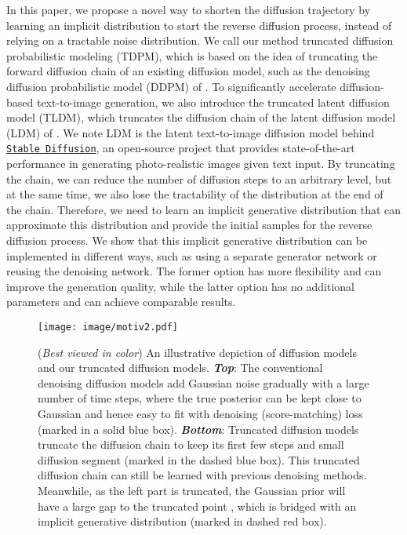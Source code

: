 \documentclass{article} \usepackage{iclr2023_conference,times}
\theoremstyle{plain}
\theoremstyle{definition}
\theoremstyle{remark}
\begin{document}
In this paper, we propose a novel way to shorten the diffusion trajectory by learning an implicit distribution to start the reverse diffusion process, instead of relying on a tractable noise distribution. We call our method truncated diffusion probabilistic modeling (TDPM), which is based on the idea of truncating the forward diffusion chain of an existing diffusion model, such as the denoising diffusion probabilistic model (DDPM) of \citet{ddpm}.  To significantly accelerate diffusion-based text-to-image generation, we also introduce the truncated latent diffusion model (TLDM), which truncates the diffusion chain of the latent diffusion model (LDM) of \citet{rombach2022high}. We note LDM is the latent text-to-image diffusion model behind \href{https://stability.ai/blog/stable-diffusion-public-release}{\texttt{Stable Diffusion}}, an open-source project that provides state-of-the-art performance in generating photo-realistic images given text input.  
By truncating the chain, we can reduce the number of diffusion steps to an arbitrary level, but at the same time, we also lose the tractability of the distribution at the end of the chain. Therefore, we need to learn an implicit generative distribution that can approximate this distribution and provide the initial samples for the reverse diffusion process. We show that this implicit generative distribution can be implemented in different ways, such as using a separate generator network or reusing the denoising network. The former option has more flexibility and can improve the generation quality, while the latter option has no additional parameters and can achieve comparable results.



\begin{figure*}[t]
    \centering
    \texttt{[image: image/motiv2.pdf]}
    \vspace{-8mm}
    \caption{{\small (\textit{Best viewed in color}) An illustrative depiction of diffusion models and our truncated diffusion models.  \textbf{\textit{Top}}: The conventional denoising diffusion models add Gaussian noise gradually with a large number of time steps, where the true posterior can be kept close to Gaussian and hence easy to fit with denoising (score-matching) loss (marked in a solid blue box). \textbf{\textit{Bottom}}: Truncated diffusion models truncate the diffusion chain to keep its first few steps and small diffusion segment (marked in the dashed blue box). This truncated diffusion chain can still be learned with previous denoising methods. Meanwhile, as the left part is truncated, the Gaussian prior  will have a large gap to the truncated point , which is bridged with an implicit generative distribution  (marked in dashed red box).}}
    \label{fig:motivation}
    \vspace{-5mm}
\end{figure*}
\end{document}
